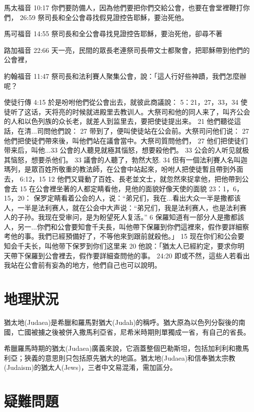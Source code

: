 馬太福音 
10:17 你們要防備人，因為他們要把你們交給公會，也要在會堂裡鞭打你們，
26:59 祭司長和全公會尋找假見證控告耶穌，要治死他。

馬可福音 14:55 祭司長和全公會尋找見證控告耶穌，要治死他，卻尋不著

路加福音 22:66 天一亮，民間的眾長老連祭司長帶文士都聚會，把耶穌帶到他們的公會裡，

約翰福音 11:47 祭司長和法利賽人聚集公會，說：「這人行好些神蹟，我們怎麼辦呢？

使徒行傳 
4:15 於是吩咐他們從公會出去，就彼此商議說：
5：21，27，33，34 使徒听了这话，天将亮的时候就进殿里去教训人。大祭司和他的同人来了，叫齐公会的人和以色列族的众长老，就差人到监里去，要把使徒提出来。 21 他們聽從這話，在清...司問他們說： 27 带到了，便叫使徒站在公会前。大祭司问他们说： 27 他們把使徒們帶來後，叫他們站在議會當中。大祭司質問他們， 27 他们把使徒们带来后，叫他...33 公會的人聽見就極其惱怒，想要殺他們。 33 公会的人听见就极其恼怒，想要杀他们。 33 議會的人聽了，勃然大怒. 34 但有一個法利賽人名叫迦瑪列，是眾百姓所敬重的教法師，在公會中站起來，吩咐人把使徒暫且帶到外面去，
6:12，15 12 他們又聳動了百姓、長老並文士，就忽然來捉拿他，把他帶到公會去  15 在公會裡坐著的人都定睛看他，見他的面貌好像天使的面貌
23：1，6，15，20： 保罗定睛看着公会的人，说：“弟兄们，我在...看出大众一半是撒都该人，一半是法利赛人，就在公会中大声说：“弟兄们，我是法利赛人，也是法利赛人的子孙。我现在受审问，是为盼望死人复活。” 6 保羅知道有一部分人是撒都該人，另一...你們和公會要知會千夫長，叫他帶下保羅到你們這裡來，假作要詳細察考他的事。我們已經預備好了，不等他來到跟前就殺他。」 15 现在你们和公会要知会千夫长，叫他带下保罗到你们这里来  20 他說：「猶太人已經約定，要求你明天帶下保羅到公會裡去，假作要詳細查問他的事。
24:20 即或不然，這些人若看出我站在公會前有妄為的地方，他們自己也可以說明。

\section{地理狀況}

猶太地(Judaea)是希臘和羅馬對猶大(Judah)的稱呼。猶大原為以色列分裂後的南國，亡國被擄之後被併入撒馬利亞省，尼希米時期則單獨成一省，有自己的省長。

希臘羅馬時期的猶太(Judaea)廣義來說，它涵蓋整個巴勒斯坦，包括加利利和撒馬利亞；狹義的意思則只包括原先猶大的地區。猶太地(Judaea)和信奉猶太宗教(Judaism)的猶太人(Jews)，三者中文易混淆，需加區分。


\section{疑難問題}
